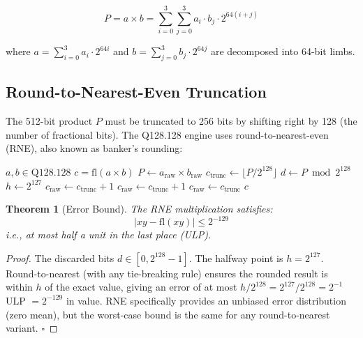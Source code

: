 \documentclass[11pt]{article}
\newtheorem{theorem}{Theorem}
\begin{document}
\begin{equation}
P = a \times b = \sum_{i=0}^{3} \sum_{j=0}^{3} a_i \cdot b_j \cdot 2^{64(i+j)}
\end{equation}

where $a = \sum_{i=0}^{3} a_i \cdot 2^{64i}$ and $b = \sum_{j=0}^{3} b_j \cdot 2^{64j}$ are decomposed into 64-bit limbs.

\subsection{Round-to-Nearest-Even Truncation}

The 512-bit product $P$ must be truncated to 256 bits by shifting right by 128 (the number of fractional bits). The Q128.128 engine uses round-to-nearest-even (RNE), also known as banker's rounding:

\begin{algorithm}
\caption{RNE Multiplication}\label{alg:rne}
\begin{algorithmic}[1]
\Require $a, b \in \text{Q128.128}$
\Ensure $c = \mathrm{fl}(a \times b)$
\State $P \gets a_{\text{raw}} \times b_{\text{raw}}$ 
\State $c_{\text{trunc}} \gets \lfloor P / 2^{128} \rfloor$ 
\State $d \gets P \bmod 2^{128}$ 
\State $h \gets 2^{127}$ 
    \State $c_{\text{raw}} \gets c_{\text{trunc}} + 1$ 
    \State $c_{\text{raw}} \gets c_{\text{trunc}} + 1$ 
\Else
    \State $c_{\text{raw}} \gets c_{\text{trunc}}$ 
\EndIf
\State \Return $c$
\end{algorithmic}
\end{algorithm}

\begin{theorem}[Error Bound]
The RNE multiplication satisfies:
\begin{equation}
|xy - \mathrm{fl}(xy)| \leq 2^{-129}
\end{equation}
i.e., at most half a unit in the last place (ULP).
\end{theorem}

\begin{proof}
The discarded bits $d \in [0, 2^{128} - 1]$. The halfway point is $h = 2^{127}$. Round-to-nearest (with any tie-breaking rule) ensures the rounded result is within $h$ of the exact value, giving an error of at most $h / 2^{128} = 2^{127} / 2^{128} = 2^{-1}$ ULP $= 2^{-129}$ in value. RNE specifically provides an unbiased error distribution (zero mean), but the worst-case bound is the same for any round-to-nearest variant. $\square$
\end{proof}
\end{document}
